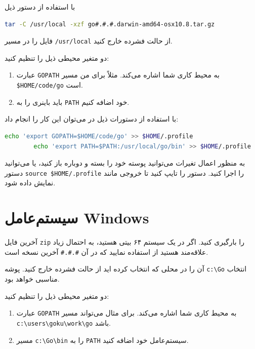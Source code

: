 \documentclass{book}
\begin{document}
  با استفاده از دستور  ذیل
  \begin{latin}
  	\begin{lstlisting}[language=bash]
  		tar -C /usr/local -xzf go#.#.#.darwin-amd64-osx10.8.tar.gz
  	\end{lstlisting}
  \end{latin}
  
  فایل را در مسیر
  \verb*|/usr/local|
  از حالت فشرده خارج کنید.
  
  دو متغیر محیطی ذیل را تنظیم کنید:
\begin{enumerate}
	\item
	عبارت \verb*|GOPATH| به محیط کاری شما اشاره می‌کند. مثلاً برای من مسیر \verb*|$HOME/code/go| است.
	\item
	
 باید باینری  را به \verb*|PATH| خود اضافه کنیم.
	
\end{enumerate}
با استفاده از دستورات ذیل در  می‌توان این کار را انجام داد:
\begin{latin}
	\begin{lstlisting}[language=bash]
		echo 'export GOPATH=$HOME/code/go' >> $HOME/.profile
		echo 'export PATH=$PATH:/usr/local/go/bin' >> $HOME/.profile
	\end{lstlisting}
\end{latin}
به منظور اعمال تغیرات می‌توانید پوسته خود را بسته و دوباره باز کنید، یا می‌توانید دستور \verb*|source $HOME/.profile| را اجرا کنید.
دستور   را تایپ کنید تا خروجی مانند  نمایش داده شود.
\newpage
\section{سیستم‌عامل Windows}
آخرین فایل  \verb*|zip| را بارگیری کنید. اگر در یک سیستم ۶۴ بیتی هستید، به احتمال زیاد علاقه‌مند هستید از
 
استفاده نمایید که در آن \verb*|#.#.#| آخرین نسخه  است.

آن را در محلی که انتخاب کرده اید از حالت فشرده خارج کنید. پوشه \verb*|c:\Go| انتخاب مناسبی خواهد بود.

دو متغیر محیطی ذیل را تنظیم کنید:
\begin{enumerate}
	\item
	عبارت \verb*|GOPATH| به محیط کاری شما اشاره می‌کند. برای مثال می‌تواند مسیر \verb*|c:\users\goku\work\go| باشد.
	\item
	
	مسیر  \verb*|c:\Go\bin| را به \verb*|PATH|  سیستم‌عامل خود اضافه کنید.
\end{enumerate}
	
\end{document}
